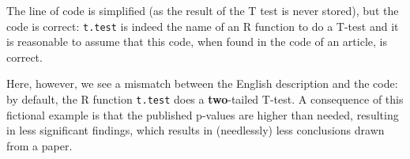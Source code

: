 The line of code is simplified (as the result of the T test is never stored),
but the code is correct:
\verb|t.test| is indeed the name of an R function to do a T-test
and it is reasonable to assume that this code, when found in the code
of an article, is correct.

Here, however, we see a mismatch between the English description and the code:
by default, the R function \verb|t.test| does a \textbf{two}-tailed T-test.
A consequence of this fictional example is that the published p-values are
higher than needed, resulting in less significant findings, which
results in (needlessly) less conclusions drawn from a paper.

